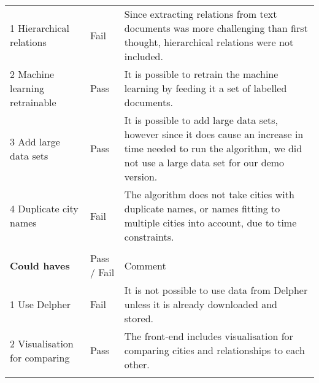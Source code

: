 \begin{table}[H]
\begin{tabular}{ll m{8cm}}
1 Hierarchical relations       & Fail        & Since extracting relations from text documents was more challenging than first thought, hierarchical relations were not included.                                                         \\
2 Machine learning retrainable & Pass        & It is possible to retrain the machine learning by feeding it a set of labelled documents.                                                                                                                                              \\
3 Add large data sets           & Pass        & It is possible to add large  data sets, however since it does cause an increase in time needed to run the algorithm, we did not use a large data set for our demo version.                     \\
4 Duplicate city names         & Fail        & The algorithm does not take cities with duplicate names, or names fitting to multiple cities into account, due to time constraints.                                                         \\
                               &             &                                                                                                                                                                                                                                       \\
\textbf{Could haves}                    & Pass / Fail & Comment                                                                                                                                                                                                                               \\
1 Use Delpher                  & Fail        & It is not possible to use data from Delpher unless it is already downloaded and stored.                                                                                                                                               \\
2 Visualisation for comparing  & Pass        & The front-end includes visualisation for comparing cities and relationships to each other.                                                                                                                                            \\
                               &             &                                                                                                                                                                                                                                       \\

\end{tabular}
\end{table}
